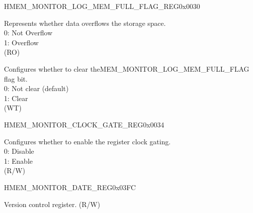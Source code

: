 \begin{register}{H}{MEM\_MONITOR\_LOG\_MEM\_FULL\_FLAG\_REG}{0x0030}\label{regdesc:MEMMONITORLOGMEMFULLFLAGREG}
%
%
%
\regnewline%
\begin{regdesc}\begin{reglist}
\label{fielddesc:MEMMONITORLOGMEMFULLFLAG}\item [MEM\_MONITOR\_LOG\_MEM\_FULL\_FLAG] Represents whether data overflows the storage space.\\
0: Not Overflow\\
1: Overflow\\ 
(RO)
\label{fielddesc:MEMMONITORCLRLOGMEMFULLFLAG}\item [MEM\_MONITOR\_CLR\_LOG\_MEM\_FULL\_FLAG] Configures whether to clear theMEM\_MONITOR\_LOG\_MEM\_FULL\_FLAG flag bit.\\
0: Not clear (default)\\
1: Clear\\ 
(WT)
\end{reglist}\end{regdesc}
\end{register}


\begin{register}{H}{MEM\_MONITOR\_CLOCK\_GATE\_REG}{0x0034}\label{regdesc:MEMMONITORCLOCKGATEREG}
%
%
\regnewline%
\begin{regdesc}\begin{reglist}
\label{fielddesc:MEMMONITORCLKEN}\item [MEM\_MONITOR\_CLK\_EN] Configures whether to enable the register clock gating.\\
0: Disable\\
1: Enable\\ 
(R/W)
\end{reglist}\end{regdesc}
\end{register}


\begin{register}{H}{MEM\_MONITOR\_DATE\_REG}{0x03FC}\label{regdesc:MEMMONITORDATEREG}
%
%
\regnewline%
\begin{regdesc}\begin{reglist}
\label{fielddesc:MEMMONITORDATE}\item [MEM\_MONITOR\_DATE] Version control register. (R/W)
\end{reglist}\end{regdesc}
\end{register}
